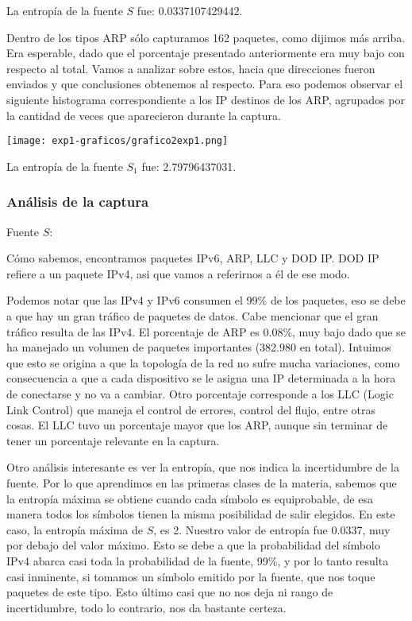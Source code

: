 La entrop\'ia de la fuente $S$ fue: 0.0337107429442.\newline

Dentro de los tipos ARP s\'olo capturamos 162 paquetes, como dijimos m\'as arriba. Era esperable, dado que el porcentaje presentado anteriormente era muy bajo con respecto al total. \newline
Vamos a analizar sobre estos, hacia que direcciones fueron enviados y que conclusiones obtenemos al respecto. Para eso podemos observar el siguiente histograma correspondiente a los IP destinos de los ARP, agrupados por la cantidad de veces que aparecieron durante la captura.

\begin{center}
\texttt{[image: exp1-graficos/grafico2exp1.png]}
\end{center}

La entrop\'ia de la fuente $S_1$ fue: 2.79796437031.


\subsubsection{An\'alisis de la captura}

Fuente $S$:\newline

C\'omo sabemos, encontramos paquetes IPv6, ARP, LLC y DOD IP. DOD IP refiere a un paquete IPv4, asi que vamos a referirnos a \'el de ese modo.\newline

Podemos notar que las IPv4 y IPv6 consumen el 99\% de los paquetes, eso se debe a que hay un gran tr\'afico de paquetes de datos. Cabe mencionar que el gran tr\'afico resulta de las IPv4. \newline
El porcentaje de ARP es 0.08\%, muy bajo dado que se ha manejado un volumen de paquetes importantes (382.980 en total). Intuimos que esto se origina a que la topología de la red no sufre mucha variaciones, como consecuencia a que a cada dispositivo se le asigna una IP determinada a la hora de conectarse y no va a cambiar. \newline
Otro porcentaje corresponde a los LLC (Logic Link Control) que maneja el control de errores, control del flujo, entre otras cosas. El LLC tuvo un porcentaje mayor que los ARP, aunque sin terminar de tener un porcentaje relevante en la captura.\newline

Otro an\'alisis interesante es ver la entrop\'ia, que nos indica la incertidumbre de la fuente. Por lo que aprendimos en las primeras clases de la materia, sabemos que la entrop\'ia m\'axima se obtiene cuando cada s\'imbolo es equiprobable, de esa manera todos los s\'imbolos tienen la misma posibilidad de salir elegidos. En este caso, la entrop\'ia m\'axima de $S$, es 2. Nuestro valor de entrop\'ia fue 0.0337, muy por debajo del valor m\'aximo. Esto se debe a que la probabilidad del s\'imbolo IPv4 abarca casi toda la probabilidad de la fuente, 99\%, y por lo tanto resulta casi inminente, si tomamos un s\'imbolo emitido por la fuente, que nos toque paquetes de este tipo. Esto \'ultimo casi que no nos deja ni rango de incertidumbre, todo lo contrario, nos da bastante certeza. \newline

